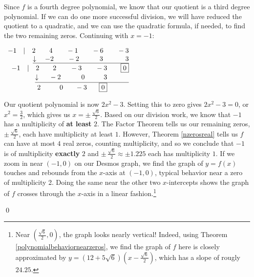 \documentclass{ximera}
\begin{document}
\begin{example}
\begin{enumerate}
 
Since $f$ is a fourth degree polynomial, we know that our quotient is a third degree polynomial.  If we can do one more successful division, we will have reduced the quotient  to a quadratic, and we can use the quadratic formula, if needed, to find the two  remaining  zeros.  Continuing with $x=-1$:

\begin{center}
$
\begin{array}{r}
 -1 \quad |\quad 2 \quad\quad 4 \quad\quad -1 \quad\quad -6 \quad\quad -3\\
 \underline{\downarrow \quad -2 \quad\quad -2 \phantom{11}\quad\quad 3 \phantom{11.}\quad\quad 3}\\
 -1 \quad |\quad 2 \quad\quad 2 \quad\quad -3 \quad\quad -3 \quad\quad \fbox{0}\\
 \underline{\downarrow \phantom{.}\quad  -2 \quad\quad\quad 0 \quad\quad\phantom{1.} 3 \phantom{\quad\quad \fbox{0}}}\\
2 \phantom{1.}\quad\quad 0 \phantom{1.}\quad -3 \phantom{1.}\quad \fbox{0} \phantom{\quad\quad \fbox{0}}
\end{array}
$    
\end{center}

 Our quotient polynomial is now $2x^2 - 3$.  Setting this to zero gives $2x^2 - 3 = 0$, or $x^2 = \frac{3}{2}$, which gives us $x = \pm \, \frac{\sqrt{6}}{2}$.  Based on our division work, we know that $-1$ has a multiplicity of \textbf{at least} $2$. The Factor Theorem tells us our remaining zeros, $\pm \, \frac{\sqrt{6}}{2}$, each have multiplicity at least $1$.  However, Theorem \ref{nzerosreal} tells us $f$ can have at most $4$ real zeros, counting multiplicity, and so we conclude that $-1$ is of multiplicity \textbf{exactly} $2$ and $\pm \, \frac{\sqrt{6}}{2} \approx \pm 1.225$ each has multiplicity $1$. If we zoom in near $(-1,0)$ on our Desmos graph, we find the graph of $y = f(x)$ touches and rebounds from the $x$-axis at $(-1,0)$, typical behavior near a zero of multiplicity 2.   Doing the same near the other two $x$-intercepts shows the graph of $f$ crosses through the $x$-axis in a linear fashion.\footnote{Near $\left(\frac{\sqrt{6}}{2}, 0\right)$, the graph looks nearly vertical!  Indeed, using Theorem \ref{polynomialbehaviornearzeros}, we find the graph of $f$ here is closely approximated by $y = \left(12 + 5 \sqrt{6}\right)\left(x-\frac{\sqrt{6}}{2}\right)$, which has a slope of rougly $24.25$. } 

\end{enumerate}

 \qed

\end{example}
\end{document}
